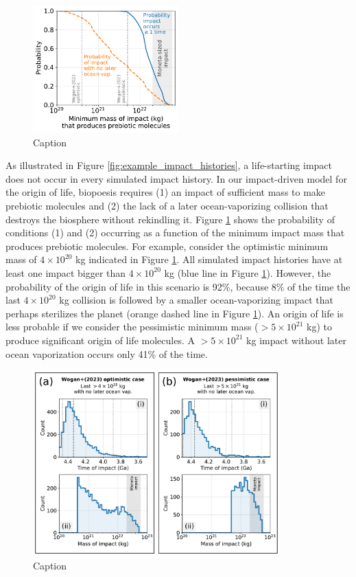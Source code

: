 \documentclass[preprint]{aastex63}
\begin{document}
\begin{figure}
  \centering
  \includegraphics[width=0.5\textwidth]{figures/probabilities_of_impacts.pdf}
  \caption{Caption}
  \label{fig:probabilities_of_impacts}
\end{figure}

As illustrated in Figure \ref{fig:example_impact_histories}, a life-starting impact does not occur in every simulated impact history. In our impact-driven model for the origin of life, biopoesis requires (1) an impact of sufficient mass to make prebiotic molecules and (2) the lack of a later ocean-vaporizing collision that destroys the biosphere without rekindling it. Figure \ref{fig:probabilities_of_impacts} shows the probability of conditions (1) and (2) occurring as a function of the minimum impact mass that produces prebiotic molecules. For example, consider the \citet{Wogan_2023} optimistic minimum mass of $4 \times 10^{20}$ kg indicated in Figure \ref{fig:probabilities_of_impacts}. All simulated impact histories have at least one impact bigger than $4 \times 10^{20}$ kg (blue line in Figure \ref{fig:probabilities_of_impacts}). However, the probability of the origin of life in this scenario is 92\%, because 8\% of the time the last $4 \times 10^{20}$ kg collision is followed by a smaller ocean-vaporizing impact that perhaps sterilizes the planet (orange dashed line in Figure \ref{fig:probabilities_of_impacts}). An origin of life is less probable if we consider the \citet{Wogan_2023} pessimistic minimum mass ($> 5 \times 10^{21}$ kg) to produce significant origin of life molecules. A $> 5 \times 10^{21}$ kg impact without later ocean vaporization occurs only 41\% of the time.

\begin{figure}
  \centering
  \includegraphics[width=0.85\textwidth]{figures/timing_and_mass.pdf}
  \caption{Caption}
  \label{fig:time_and_mass}
\end{figure}
\end{document}
